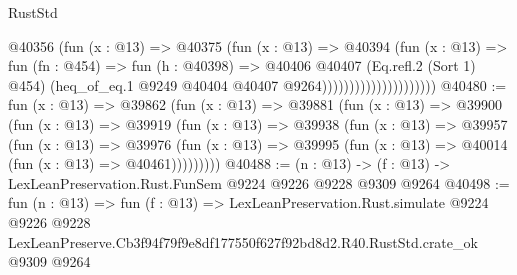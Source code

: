 \begin{lexlean}{RustStd}
\begin{coremodule}
                                    @40356
                                      (fun (x : @13) =>
                                      @40375
                                        (fun (x : @13) =>
                                        @40394
                                          (fun (x : @13) =>
                                          fun (fn : @454) =>
                                          fun (h : @40398) =>
                                          @40406
                                            @40407
                                            (Eq.refl.{2} (Sort 1) @454)
                                            (heq_of_eq.{1}
                                              @9249
                                              @40404
                                              @40407
                                              @9264)))))))))))))))))))))
@40480 := fun (x : @13) =>
  @39862
    (fun (x : @13) =>
    @39881
      (fun (x : @13) =>
      @39900
        (fun (x : @13) =>
        @39919
          (fun (x : @13) =>
          @39938
            (fun (x : @13) =>
            @39957
              (fun (x : @13) =>
              @39976
                (fun (x : @13) => @39995 (fun (x : @13) => @40014 (fun (x : @13) => @40461)))))))))
@40488 := (n : @13) -> (f : @13) -> LexLeanPreservation.Rust.FunSem @9224 @9226 @9228 @9309 @9264
@40498 := fun (n : @13) =>
  fun (f : @13) =>
  LexLeanPreservation.Rust.simulate
    @9224
    @9226
    @9228
    LexLeanPreserve.Cb3f94f79f9e8df177550f627f92bd8d2.R40.RustStd.crate_ok
    @9309
    @9264
\end{coremodule}
\end{lexlean}
